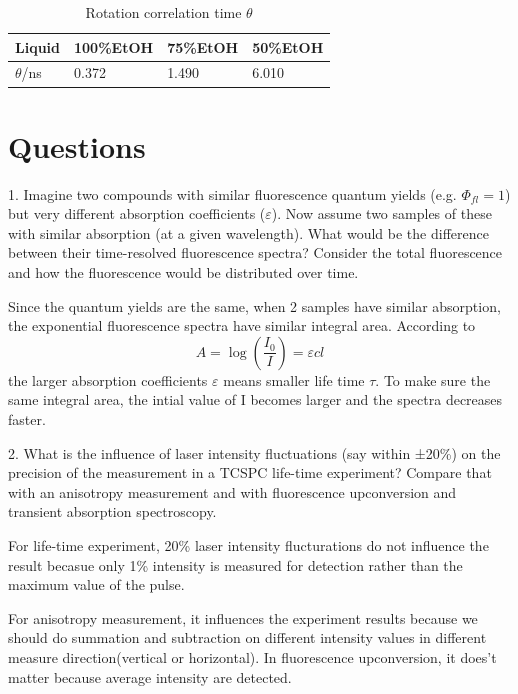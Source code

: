 \documentclass{article}
\begin{document}
\begin{table}
\centering
\caption{Rotation correlation time $\theta$}
\label{my-label3}
\begin{tabular}{@{}llll@{}}
\toprule
Liquid & 100\%EtOH & 75\%EtOH &50\%EtOH\\ \midrule
$\theta$/ns  & 0.372 & 1.490 &6.010\\ 
\bottomrule
\end{tabular}
\end{table}



\section{Questions}
1.  Imagine two compounds with similar fluorescence quantum yields (e.g. $\Phi_{fl} = 1$) but very different
absorption coefficients ($\varepsilon$). Now assume two samples of these with similar absorption (at a given
wavelength). What would be the difference between their time-resolved fluorescence spectra? Consider
the total fluorescence and how the fluorescence would be distributed over time.\\ \par 

Since the quantum yields are the same, when 2 samples have similar absorption, the exponential fluorescence spectra have similar integral area. According to 
\begin{equation}
A=\log (\frac{I_0}{I})=\varepsilon cl
\end{equation}
the larger absorption coefficients $\varepsilon$ means smaller life time $\tau$. To make sure the same integral area, the intial value of I becomes larger and the spectra decreases faster.\\ \par 


2.  What is the influence of laser intensity fluctuations (say within ±20\%) on the precision of the
measurement in a TCSPC life-time experiment? Compare that with an anisotropy measurement and with
fluorescence upconversion and transient absorption spectroscopy.\\ \par 
For life-time experiment, 20\% laser intensity flucturations do not influence the result becasue only 1\% intensity is measured for detection rather than the maximum value of the pulse.\par 
For anisotropy measurement, it influences the experiment results because we should do summation and subtraction on different intensity values in different measure direction(vertical or horizontal). In fluorescence upconversion, it does't matter because average intensity are detected. \\ \par 
\end{document}
